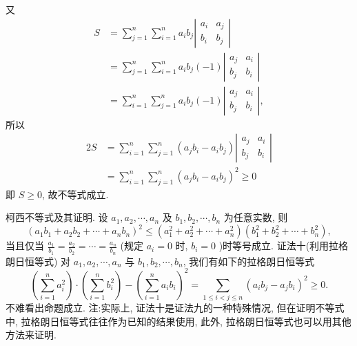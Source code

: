 又
$$
\begin{aligned}
S & =\sum_{j=1}^n \sum_{i=1}^n a_i b_j\left|\begin{array}{cc}
a_i & a_j \\
b_i & b_j
\end{array}\right| \\
& =\sum_{j=1}^n \sum_{i=1}^n a_i b_j(-1)\left|\begin{array}{ll}
a_j & a_i \\
b_j & b_i
\end{array}\right| \\
& =\sum_{i=1}^n \sum_{j=1}^n a_i b_j(-1)\left|\begin{array}{cc}
a_j & a_i \\
b_j & b_i
\end{array}\right|,
\end{aligned}
$$
所以
$$
\begin{aligned}
2 S & =\sum_{i=1}^n \sum_{j=1}^n\left(a_j b_i-a_i b_j\right)\left|\begin{array}{ll}
a_j & a_i \\
b_j & b_i
\end{array}\right| \\
& =\sum_{i=1}^n \sum_{j=1}^n\left(a_j b_i-a_i b_j\right)^2 \geqslant 0
\end{aligned}
$$
即 $S \geqslant 0$, 故不等式成立.



柯西不等式及其证明.
设 $a_1, a_2, \cdots, a_n$ 及 $b_1, b_2, \cdots, b_n$ 为任意实数, 则
$$
\left(a_1 b_1+a_2 b_2+\cdots+a_n b_n\right)^2 \leqslant\left(a_1^2+a_2^2+\cdots+a_n^2\right)\left(b_1^2+b_2^2+\cdots+b_n^2\right),
$$
当且仅当 $\frac{a_1}{b_1}=\frac{a_2}{b_2}=\cdots=\frac{a_n}{b_n}$ (规定 $a_i=0$ 时, $b_i=0$ )时等号成立.
证法十(利用拉格朗日恒等式)
对 $a_1, a_2, \cdots, a_n$ 与 $b_1, b_2, \cdots, b_n$, 我们有如下的拉格朗日恒等式
$$
\left(\sum_{i=1}^n a_i^2\right) \cdot\left(\sum_{i=1}^n b_i^2\right)-\left(\sum_{i=1}^n a_i b_i\right)^2=\sum_{1 \leqslant i<j \leqslant n}\left(a_i b_j-a_j b_i\right)^2 \geqslant 0 .
$$
不难看出命题成立.
注:实际上, 证法十是证法九的一种特殊情况, 但在证明不等式中, 拉格朗日恒等式往往作为已知的结果使用, 此外, 拉格朗日恒等式也可以用其他方法来证明.



